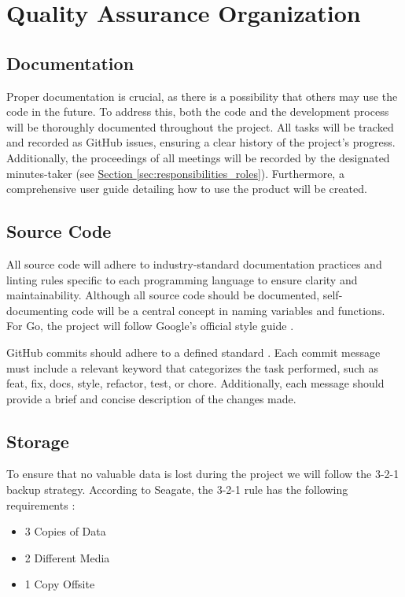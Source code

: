 \section{Quality Assurance Organization}

\subsection{Documentation}\label{sec:documentation}
Proper documentation is crucial, as there is a possibility that others may use the code in the future. To address this, both the code and the development process will be thoroughly documented throughout the project. All tasks will be tracked and recorded as GitHub issues, ensuring a clear history of the project's progress. Additionally, the proceedings of all meetings will be recorded by the designated minutes-taker (see \hyperref[sec:responsibilities_roles]{Section \ref*{sec:responsibilities_roles}}). Furthermore, a comprehensive user guide detailing how to use the product will be created.  

\subsection{Source Code}  

All source code will adhere to industry-standard documentation practices and linting rules specific to each programming language to ensure clarity and maintainability. Although all source code should be documented, self-documenting code will be a central concept in naming variables and functions. For Go, the project will follow Google's official style guide \cite{google_go_style}. 

GitHub commits should adhere to a defined standard \cite{commit_standard}. Each commit message must include a relevant keyword that categorizes the task performed, such as feat, fix, docs, style, refactor, test, or chore. Additionally, each message should provide a brief and concise description of the changes made. 

\subsection{Storage}\label{sec:storage}

To ensure that no valuable data is lost during the project we will follow the 3-2-1 backup strategy. According to Seagate, the 3-2-1 rule has the following requirements \cite{3-2-1_data_storage}:

\begin{itemize}
    \item 3 Copies of Data
    \item 2 Different Media
    \item 1 Copy Offsite
\end{itemize}

